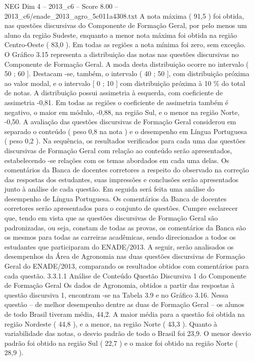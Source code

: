 \begin{textsample}{NEG Dim 4 – 2013\_c6 – Score 8.00 – 2013\_c6/enade\_2013\_agro\_5c011a4308.txt}
A nota máxima ( 91,5 ) foi obtida, nas questões discursivas do Componente de Formação Geral, por pelo menos um aluno da região Sudeste, enquanto a menor nota máxima foi obtida na região Centro-Oeste ( 83,0 ).
Em todas as regiões a nota mínima foi zero, sem exceção.
O Gráfico 3.15 representa a distribuição das notas nas questões discursivas no Componente de Formação Geral.
A moda desta distribuição ocorre no intervalo ( 50 ; 60 ].
Destacam -se, também, o intervalo ( 40 ; 50 ], com distribuição próxima ao valor modal, e o intervalo [ 0 ; 10 ] com distribuição próxima à 10 \% do total de notas.
A distribuição possui assimetria à esquerda, com coeficiente de assimetria -0,81.
Em todas as regiões o coeficiente de assimetria também é negativo, o maior em módulo, -0,88, na região Sul, e o menor na região Norte, -0,50.
A avaliação das questões discursivas de Formação Geral considerou em separado o conteúdo ( peso 0,8 na nota ) e o desempenho em Língua Portuguesa ( peso 0,2 ).
Na sequência, os resultados verificados para cada uma das questões discursivas de Formação Geral com relação ao conteúdo serão apresentados, estabelecendo -se relações com os temas abordados em cada uma delas.
Os comentários da Banca de docentes corretores a respeito do observado na correção das respostas dos estudantes, suas impressões e conclusões serão apresentados junto à análise de cada questão.
Em seguida será feita uma análise do desempenho de Língua Portuguesa.
Os comentários da Banca de docentes corretores serão apresentados para o conjunto de questões.
Cumpre esclarecer que, tendo em vista que as questões discursivas de Formação Geral são padronizadas, ou seja, constam de todas as provas, os comentários da Banca são os mesmos para todas as carreiras acadêmicas, sendo direcionados a todos os estudantes que participaram do ENADE/2013.
A seguir, serão analisados os desempenhos da Área de Agronomia nas duas questões discursivas de Formação Geral do ENADE/2013, comparando os resultados obtidos com comentários para cada questão. 3.3.1.1 Análise de Conteúdo Questão Discursiva 1 do Componente de Formação Geral Os dados de Agronomia, obtidos a partir das respostas à questão discursiva 1, encontram -se na Tabela 3.9 e no Gráfico 3.16.
Nessa questão – de melhor desempenho dentre as duas de Formação Geral – os alunos de todo Brasil tiveram média, 44,2.
A maior média para a questão foi obtida na região Nordeste ( 44,8 ), e a menor, na região Norte ( 43,3 ).
Quanto à variabilidade das notas, o desvio padrão de todo o Brasil foi 23,9.
O menor desvio padrão foi obtido na região Sul ( 22,7 ) e o maior foi obtido na região Norte ( 28,9 ).

\end{textsample}
